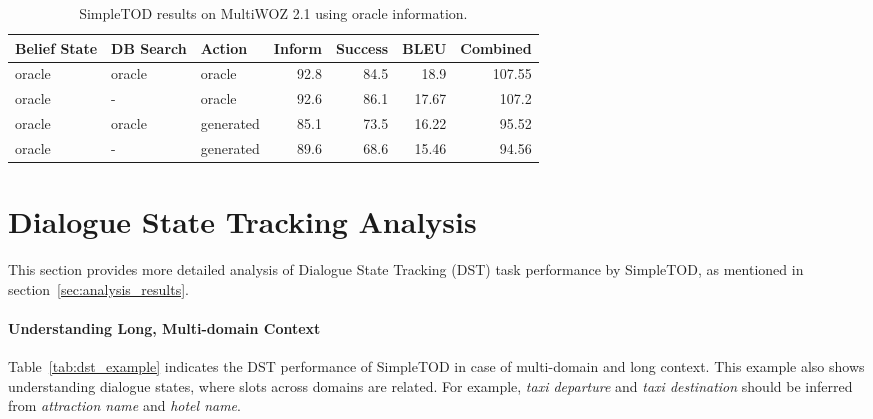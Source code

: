 \documentclass{article}
\begin{document}
 
\begin{table*}[htb!]
\centering
\small
\begin{tabular}{lllrrrr}
\hline
  Belief State & DB Search & Action & Inform &Success & BLEU & Combined\\
\hline

 oracle & oracle & oracle & 92.8 & 84.5 & 18.9 & 107.55 \\

  oracle & - & oracle & 92.6 & 86.1 & 17.67 & 107.2 \\
  \hline

 oracle & oracle & generated & 85.1 & 73.5 & 16.22 & 95.52 \\

  oracle & - & generated & 89.6 & 68.6 & 15.46 & 94.56 \\
  




\hline
\end{tabular}
\caption{\label{tab:appendix-joint-task-2.1}
SimpleTOD results on MultiWOZ 2.1 using oracle information.
}
\end{table*}

\newpage






\section{Dialogue State Tracking Analysis}
\label{appendix:dst_analysis}


This section provides more detailed analysis of Dialogue State Tracking (DST) task performance by SimpleTOD, as mentioned in section~\ref{sec:analysis_results}. 

\paragraph{Understanding Long, Multi-domain Context} Table~\ref{tab:dst_example} indicates the DST performance of SimpleTOD in case of multi-domain and long context. This example also shows understanding dialogue states, where slots across domains are related. For example, \textit{taxi departure} and \textit{taxi destination} should be inferred from \textit{attraction name} and \textit{hotel name}.
\end{document}
